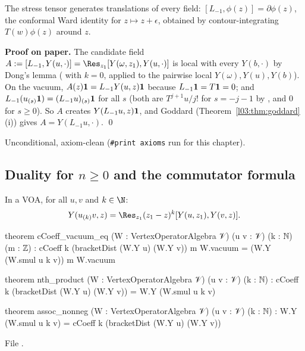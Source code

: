 \begin{physics}
The stress tensor generates translations of every field: $[L_{-1},\phi(z)] = \partial\phi(z)$, the
conformal Ward identity for $z\mapsto z+\epsilon$, obtained by contour-integrating $T(w)\phi(z)$
around $z$.
\end{physics}

\textbf{Proof on paper.} The candidate field $A := [L_{-1},Y(u,\cdot)] = \Res_{z_1}[Y(\omega,z_1),Y(u,\cdot)]$
is local with every $Y(b,\cdot)$ by Dong's lemma ( with $k = 0$, applied to the
pairwise local $Y(\omega),Y(u),Y(b)$). On the vacuum, $A(z)\mathbf{1} = L_{-1}Y(u,z)\mathbf{1}$ because
$L_{-1}\mathbf{1} = T\mathbf{1} = 0$; and $L_{-1}(u_{(s)}\mathbf{1}) = (L_{-1}u)_{(s)}\mathbf{1}$ for all $s$
(both are $T^{j+1}u/j!$ for $s = -j-1$ by , and $0$ for $s\ge0$). So $A$ creates
$Y(L_{-1}u,z)\mathbf{1}$, and Goddard (Theorem~\ref{l03:thm:goddard}(i)) gives $A = Y(L_{-1}u,\cdot)$. \qed

\begin{status}
Unconditional, axiom-clean (\texttt{\#print axioms} 
run for this chapter).
\end{status}

\subsection{Duality for \texorpdfstring{$n\ge0$}{n >= 0} and the commutator formula}

\begin{theorem}\label{l03:thm:nthproduct}
In a VOA, for all $u,v$ and $k\in\N$:
\begin{equation*}
Y(u_{(k)}v,z) = \Res_{z_1}(z_1-z)^k[Y(u,z_1),Y(v,z)] .
\end{equation*}
\end{theorem}
\begin{leancode}
theorem cCoeff_vacuum_eq (W : VertexOperatorAlgebra 𝒱) (u v : 𝒱) (k : ℕ) (m : ℤ) :
    cCoeff k (bracketDist (W.Y u) (W.Y v)) m W.vacuum = (W.Y (W.smul u k v)) m W.vacuum

theorem nth_product (W : VertexOperatorAlgebra 𝒱) (u v : 𝒱) (k : ℕ) :
    cCoeff k (bracketDist (W.Y u) (W.Y v)) = W.Y (W.smul u k v)

theorem assoc_nonneg (W : VertexOperatorAlgebra 𝒱) (u v : 𝒱) (k : ℕ) :
    W.Y (W.smul u k v) = cCoeff k (bracketDist (W.Y u) (W.Y v))
\end{leancode}
File .

